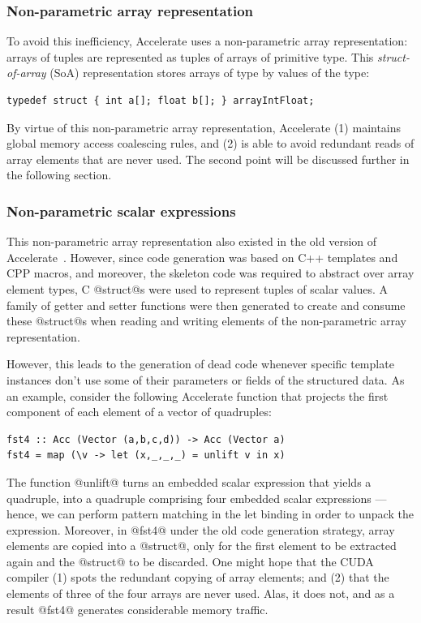 \subsubsection{Non-parametric array representation}

To avoid this inefficiency, Accelerate uses a non-parametric array
representation: arrays of tuples are represented as tuples of arrays of
primitive type. This \emph{struct-of-array}
(SoA) representation stores arrays of type
 by values of the type:
%
\begin{lstlisting}[style=cuda]
typedef struct { int a[]; float b[]; } arrayIntFloat;
\end{lstlisting}
%
By virtue of this non-parametric array representation, Accelerate (1) maintains
global memory access coalescing rules, and (2) is able to avoid redundant reads
of array elements that are never used. The second point will be discussed
further in the following section.

\subsubsection{Non-parametric scalar expressions}

This non-parametric array representation also existed in the old version of
Accelerate~\cite{Chakravarty:2011fr}. However, since code generation was based
on C++ templates and CPP macros, and moreover, the skeleton code was required to
abstract over array element types, C @struct@s were used to represent
tuples of scalar values. A family of getter and setter functions were then
generated to create and consume these @struct@s when reading and writing
elements of the non-parametric array representation.

However, this leads to the generation of dead code whenever specific template
instances don't use some of their parameters or fields of the structured data.
As an example, consider the following Accelerate function that projects the
first component of each element of a vector of quadruples:
%
\begin{lstlisting}[style=haskell]
fst4 :: Acc (Vector (a,b,c,d)) -> Acc (Vector a)
fst4 = map (\v -> let (x,_,_,_) = unlift v in x)
\end{lstlisting}
%
The function @unlift@ turns an embedded scalar expression that yields a
quadruple, into a quadruple comprising four embedded scalar expressions ---
hence, we can perform pattern matching in the let binding in order to unpack the
expression. Moreover, in @fst4@ under the old code generation strategy,
array elements are copied into a @struct@, only for the first element to be
extracted again and the @struct@ to be discarded. One might hope that the
CUDA compiler (1) spots the redundant copying of array elements; and (2) that
the elements of three of the four arrays are never used. Alas, it does not, and
as a result @fst4@ generates considerable memory traffic.

